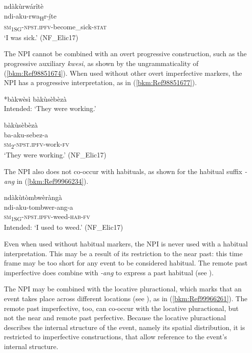 \ea
\label{bkm:Ref99966196}
\glll ndàkùrwárîtè\\
ndi-aku-rwa\textsubscript{H}r-í̲te\\
\textsc{sm}\textsubscript{1SG}-\textsc{npst}.\textsc{ipfv}-become\_sick-\textsc{stat}\\
\glt ‘I was sick.’ (NF\_Elic17)
\z

The NPI cannot be combined with an overt progressive construction, such as the progressive auxiliary \textit{kwesi}, as shown by the ungrammaticality of (\ref{bkm:Ref98851674}). When used without other overt imperfective markers, the NPI has a progressive interpretation, as in (\ref{bkm:Ref98851677}).

\ea
\label{bkm:Ref98851674}
  *bàkwèsì bàkùsèbèzà\\
Intended: ‘They were working.’
\z

\ea
\label{bkm:Ref98851677}
\glll bàkùsèbèzà\\
ba-aku-sebez-a\\
\textsc{sm}\textsubscript{2}-\textsc{npst}.\textsc{ipfv}-work-\textsc{fv}\\
\glt ‘They were working.’ (NF\_Elic17)
\z

The NPI also does not co-occur with habituals, as shown for the habitual suffix \textit{-ang} in (\ref{bkm:Ref99966234}).

\ea
\label{bkm:Ref99966234}
\glll *ndàkùtòmbwèràngà\\
ndi-aku-tombwer-ang-a\\
\textsc{sm}\textsubscript{1SG}-\textsc{npst}.\textsc{ipfv}-weed-\textsc{hab}-\textsc{fv}\\
\glt Intended: ‘I used to weed.’ (NF\_Elic17)
\z

Even when used without habitual markers, the NPI is never used with a habitual interpretation. This may be a result of its restriction to the near past: this time frame may be too short for any event to be considered habitual. The remote past imperfective does combine with \textit{-ang} to express a past habitual (see ).

The NPI may be combined with the locative pluractional, which marks that an event takes place across different locations (see ), as in (\ref{bkm:Ref99966261}). The remote past imperfective, too, can co-occur with the locative pluractional, but not the near and remote past perfective. Because the locative pluractional describes the internal structure of the event, namely its spatial distribution, it is restricted to imperfective constructions, that allow reference to the event’s internal structure.

